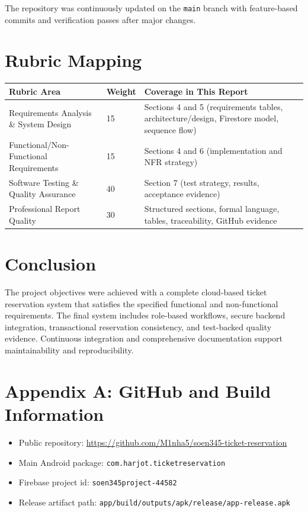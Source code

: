 \documentclass[12pt,a4paper]{article}
\begin{document}
The repository was continuously updated on the \texttt{main} branch with feature-based commits and verification passes after major changes.

\section{Rubric Mapping}

\begin{longtable}{p{5.8cm}p{2.5cm}p{7cm}}
\toprule
\textbf{Rubric Area} & \textbf{Weight} & \textbf{Coverage in This Report} \\
\midrule
Requirements Analysis \& System Design & 15 & Sections 4 and 5 (requirements tables, architecture/design, Firestore model, sequence flow) \\
Functional/Non-Functional Requirements & 15 & Sections 4 and 6 (implementation and NFR strategy) \\
Software Testing \& Quality Assurance & 40 & Section 7 (test strategy, results, acceptance evidence) \\
Professional Report Quality & 30 & Structured sections, formal language, tables, traceability, GitHub evidence \\
\bottomrule
\end{longtable}

\section{Conclusion}

The project objectives were achieved with a complete cloud-based ticket reservation system that satisfies the specified functional and non-functional requirements. The final system includes role-based workflows, secure backend integration, transactional reservation consistency, and test-backed quality evidence. Continuous integration and comprehensive documentation support maintainability and reproducibility.

\section*{Appendix A: GitHub and Build Information}

\begin{itemize}
    \item Public repository: \url{https://github.com/M1nha5/soen345-ticket-reservation}
    \item Main Android package: \texttt{com.harjot.ticketreservation}
    \item Firebase project id: \texttt{soen345project-44582}
    \item Release artifact path: \texttt{app/build/outputs/apk/release/app-release.apk}
\end{itemize}
\end{document}
